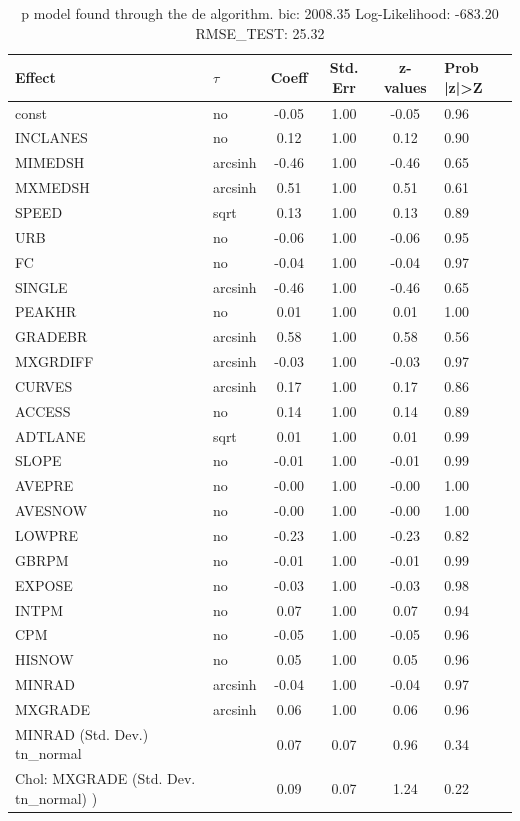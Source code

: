 \begin{table}
	\caption{p model found through the de algorithm. bic: 2008.35 Log-Likelihood: -683.20 RMSE_TEST: 25.32}
	\begin{center}
		\begin{tabular}{|l|l|c|c|c|l|}
			\hline
			Effect & $\tau$ & Coeff & Std. Err & z-values & Prob |z|>Z \\
			\hline
			const & no & -0.05 & 1.00 & -0.05 & 0.96 \\
			\hline
			INCLANES & no & 0.12 & 1.00 & 0.12 & 0.90 \\
			\hline
			MIMEDSH & arcsinh & -0.46 & 1.00 & -0.46 & 0.65 \\
			\hline
			MXMEDSH & arcsinh & 0.51 & 1.00 & 0.51 & 0.61 \\
			\hline
			SPEED & sqrt & 0.13 & 1.00 & 0.13 & 0.89 \\
			\hline
			URB & no & -0.06 & 1.00 & -0.06 & 0.95 \\
			\hline
			FC & no & -0.04 & 1.00 & -0.04 & 0.97 \\
			\hline
			SINGLE & arcsinh & -0.46 & 1.00 & -0.46 & 0.65 \\
			\hline
			PEAKHR & no & 0.01 & 1.00 & 0.01 & 1.00 \\
			\hline
			GRADEBR & arcsinh & 0.58 & 1.00 & 0.58 & 0.56 \\
			\hline
			MXGRDIFF & arcsinh & -0.03 & 1.00 & -0.03 & 0.97 \\
			\hline
			CURVES & arcsinh & 0.17 & 1.00 & 0.17 & 0.86 \\
			\hline
			ACCESS & no & 0.14 & 1.00 & 0.14 & 0.89 \\
			\hline
			ADTLANE & sqrt & 0.01 & 1.00 & 0.01 & 0.99 \\
			\hline
			SLOPE & no & -0.01 & 1.00 & -0.01 & 0.99 \\
			\hline
			AVEPRE & no & -0.00 & 1.00 & -0.00 & 1.00 \\
			\hline
			AVESNOW & no & -0.00 & 1.00 & -0.00 & 1.00 \\
			\hline
			LOWPRE & no & -0.23 & 1.00 & -0.23 & 0.82 \\
			\hline
			GBRPM & no & -0.01 & 1.00 & -0.01 & 0.99 \\
			\hline
			EXPOSE & no & -0.03 & 1.00 & -0.03 & 0.98 \\
			\hline
			INTPM & no & 0.07 & 1.00 & 0.07 & 0.94 \\
			\hline
			CPM & no & -0.05 & 1.00 & -0.05 & 0.96 \\
			\hline
			HISNOW & no & 0.05 & 1.00 & 0.05 & 0.96 \\
			\hline
			MINRAD & arcsinh & -0.04 & 1.00 & -0.04 & 0.97 \\
			\hline
			MXGRADE & arcsinh & 0.06 & 1.00 & 0.06 & 0.96 \\
			\hline
			MINRAD (Std. Dev.) tn_normal &  & 0.07 & 0.07 & 0.96 & 0.34 \\
			\hline
			 Chol: MXGRADE (Std. Dev. tn_normal) ) &  & 0.09 & 0.07 & 1.24 & 0.22 \\
			\hline
		\end{tabular}
	\end{center}
\end{table}